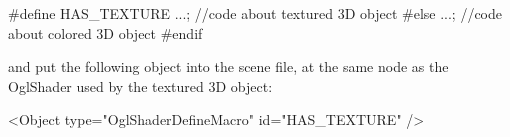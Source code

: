 	\begin{code_cpp} 
		#define HAS_TEXTURE
			...;
			//code about textured 3D object
		#else
			...;
			//code about colored 3D object
		#endif
	\end{code_cpp}

and put the following object into the scene file, at the same node as the OglShader used by the textured 3D object:

	\begin{code_xml} 
		<Object type="OglShaderDefineMacro" id="HAS_TEXTURE" />
	\end{code_xml}


